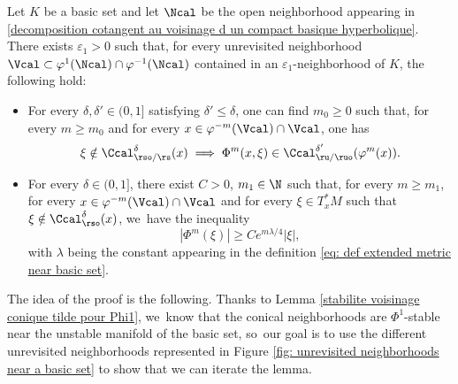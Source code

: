 \begin{corollary}\label{corollary big lemma} Let $K$ be a basic set and let $\Ncal$ be the open neighborhood appearing in \eqref{decomposition cotangent au voisinage d un compact basique hyperbolique}. There exists $\varepsilon_1 >0$ such that, for every unrevisited neighborhood $\Vcal\subset \varphi^1(\Ncal) \cap\nobreak\varphi^{-1}(\Ncal)$ contained in an $\varepsilon_1$-neighborhood of $K$, the following hold:
\begin{itemize}
\item For every $\delta,\delta'\in(0,1]$ satisfying $\delta' \leq \delta$, one can find $m_{0}\geq 0$ such that, for every $m \geq m_{0}$ and for every $x \in \varphi^{-m}(\Vcal)\cap \Vcal$, one has
\[
\xi \notin \Ccal_{\rso/\rs}^{\delta} (x) \implies \Phi^{ m} (x,\xi) \in \Ccal_{\ru/\ruo}^{\delta'} (\varphi^{m} (x)).
\]
\item For every $\delta\in(0,1]$, there exist $C > 0$, $m_1 \in \N$ such that, for every $m \geq m_1$, for every $x \in \varphi^{-m}(\Vcal)\cap \Vcal$ and for every $\xi \in T_x^* M$ such that $ \xi \notin \Ccal_{\rso}^{\delta} (x) $, we~have the inequality
\begin{equation}\label{eq: corollary big lemma - statement exponential estimates}
|\Phi^{ m} (\xi)| \geq C e^{m \lambda /4} |\xi|,
\end{equation}
with $\lambda$ being the constant appearing in the definition \eqref{eq: def extended metric near basic set}.
\end{itemize}
\end{corollary}

The idea of the proof is the following. Thanks to Lemma \ref{stabilite voisinage conique tilde pour Phi1}, we~know that the conical neighborhoods are $\Phi^1$-stable near the unstable manifold of the basic set, so~our goal is to use the different unrevisited neighborhoods represented in Figure \ref{fig: unrevisited neighborhoods near a basic set} to show that we can iterate the lemma.

